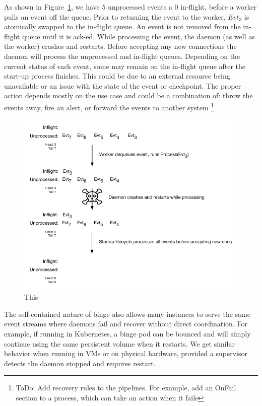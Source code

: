 \documentclass[10pt,twocolumn]{article}
\begin{document}
As shown in Figure~\ref{fig:durable-queue}, we have $5$ unprocessed events a
$0$ in-flight, before a worker pulls an event off the queue.  Prior to
returning the event to the worker, $Evt_{3}$ is atomically swapped to the
in-flight queue.  An event is not removed from the in-flight queue until it is
ack-ed.  While processing the event, the daemon (as well as the worker) crashes
and restarts.  Before accepting any new connections the daemon will process
the unprocessed and in-flight queues.  Depending on the current status of each
event, some may remain on the in-flight queue after the start-up process
finishes.  This could be due to an external resource being unavailable or an
issue with the state of the event or checkpoint.  The proper action depends
mostly on the use case and could be a combination of: throw the events away,
fire an alert, or forward the events to another system \footnote{ToDo: Add
recovery rules to the pipelines.  For example, add an OnFail section to a
process, which can take an action when it fails}

\begin{figure}[h]
\centering
\includegraphics[scale=0.60]{figures/durable-queue.pdf}
\caption{This}
\label{fig:durable-queue}
\end{figure}

The self-contained nature of binge also allows many instances to serve the same
event streams where daemons fail and recover without direct coordination.  For
example, if running in Kubernetes, a binge pod can be bounced and will simply
continue using the same persistent volume when it restarts.  We get similar
behavior when running in VMs or on physical hardware, provided a supervisor
detects the daemon stopped and requires restart.
\end{document}

